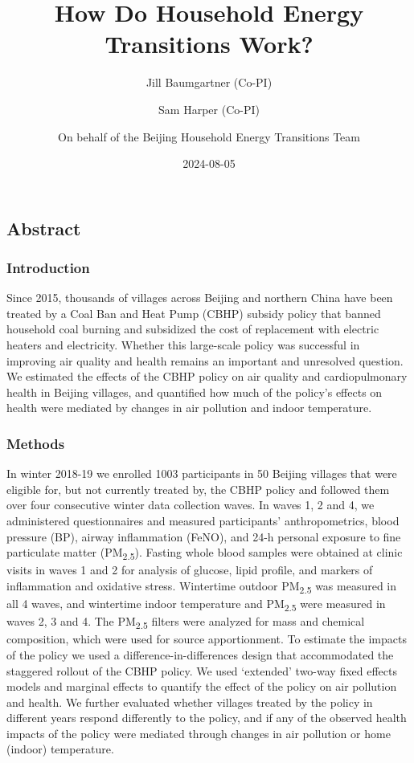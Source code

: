 \documentclass[
  letterpaper,
  DIV=11,
  numbers=noendperiod]{scrartcl}
\title{How Do Household Energy Transitions Work?}
\author{Jill Baumgartner (Co-PI) \and Sam Harper (Co-PI) \and On behalf
of the Beijing Household Energy Transitions Team}
\date{2024-08-05}
\renewcommand*\contentsname{Table of contents}
\newcommand\contentsname{Table of contents}
\begin{document}
\maketitle

\renewcommand*\contentsname{Table of contents}
{
\hypersetup{linkcolor=}
\setcounter{tocdepth}{3}
\tableofcontents
}

\subsection*{Abstract}\label{abstract}

\subsubsection*{Introduction}\label{introduction}

Since 2015, thousands of villages across Beijing and northern China have
been treated by a Coal Ban and Heat Pump (CBHP) subsidy policy that
banned household coal burning and subsidized the cost of replacement
with electric heaters and electricity. Whether this large-scale policy
was successful in improving air quality and health remains an important
and unresolved question. We estimated the effects of the CBHP policy on
air quality and cardiopulmonary health in Beijing villages, and
quantified how much of the policy's effects on health were mediated by
changes in air pollution and indoor temperature.

\subsubsection*{Methods}\label{methods}

In winter 2018-19 we enrolled 1003 participants in 50 Beijing villages
that were eligible for, but not currently treated by, the CBHP policy
and followed them over four consecutive winter data collection waves. In
waves 1, 2 and 4, we administered questionnaires and measured
participants' anthropometrics, blood pressure (BP), airway inflammation
(FeNO), and 24-h personal exposure to fine particulate matter
(PM\textsubscript{2.5}). Fasting whole blood samples were obtained at
clinic visits in waves 1 and 2 for analysis of glucose, lipid profile,
and markers of inflammation and oxidative stress. Wintertime outdoor
PM\textsubscript{2.5} was measured in all 4 waves, and wintertime indoor
temperature and PM\textsubscript{2.5} were measured in waves 2, 3 and 4.
The PM\textsubscript{2.5} filters were analyzed for mass and chemical
composition, which were used for source apportionment. To estimate the
impacts of the policy we used a difference-in-differences design that
accommodated the staggered rollout of the CBHP policy. We used
`extended' two-way fixed effects models and marginal effects to quantify
the effect of the policy on air pollution and health. We further
evaluated whether villages treated by the policy in different years
respond differently to the policy, and if any of the observed health
impacts of the policy were mediated through changes in air pollution or
home (indoor) temperature.
\end{document}
